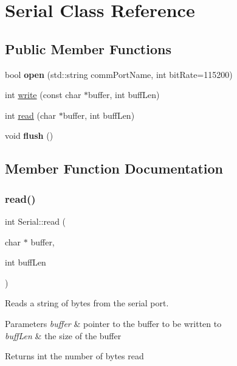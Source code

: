 \hypertarget{class_serial}{}\section{Serial Class Reference}
\label{class_serial}
\subsection*{Public Member Functions}
\begin{DoxyCompactItemize}
\item 
\hypertarget{class_serial_a599d3e220888815b8da436ea45a5c655}{}\label{class_serial_a599d3e220888815b8da436ea45a5c655} 
bool {\bfseries open} (std\+::string comm\+Port\+Name, int bit\+Rate=115200)
\item 
int \hyperlink{class_serial_aae3d630a4fd81c8b148cb4eebdb91392}{write} (const char $\ast$buffer, int buff\+Len)
\item 
int \hyperlink{class_serial_a8266889eb5bfa7ef8b53595c5482133d}{read} (char $\ast$buffer, int buff\+Len)
\item 
\hypertarget{class_serial_a63b7abf172cad25bfc998b3b1f98310f}{}\label{class_serial_a63b7abf172cad25bfc998b3b1f98310f} 
void {\bfseries flush} ()
\end{DoxyCompactItemize}


\subsection{Member Function Documentation}
\hypertarget{class_serial_a8266889eb5bfa7ef8b53595c5482133d}{}\label{class_serial_a8266889eb5bfa7ef8b53595c5482133d} 
\subsubsection{\texorpdfstring{read()}{read()}}
{\footnotesize\ttfamily int Serial\+::read (\begin{DoxyParamCaption}\item[{char $\ast$}]{buffer,  }\item[{int}]{buff\+Len }\end{DoxyParamCaption})}

Reads a string of bytes from the serial port.


\begin{DoxyParams}{Parameters}
{\em buffer} & pointer to the buffer to be written to \\
\hline
{\em buff\+Len} & the size of the buffer\\
\hline
\end{DoxyParams}
\begin{DoxyReturn}{Returns}
int the number of bytes read 
\end{DoxyReturn}
\hypertarget{class_serial_aae3d630a4fd81c8b148cb4eebdb91392}{}\label{class_serial_aae3d630a4fd81c8b148cb4eebdb91392} 

